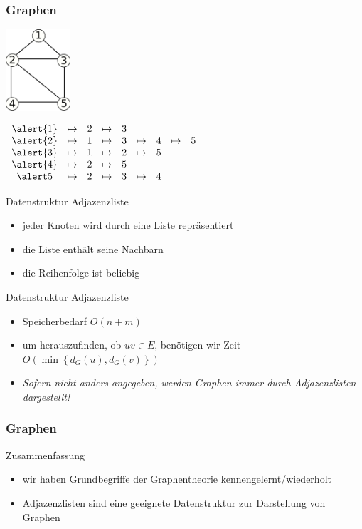 \documentclass[aspectratio=1610, 11pt]{beamer}
\newcommand\cbc[1]{\left\{{#1}\right\}}
\newcommand{\mytitle}{Graphen}
\begin{document}
\begin{frame}\frametitle{\mytitle}
	\includegraphics[height=30mm]{images/house.pdf}\hfill\parbox[t]{70mm}{\vspace{-26mm}$\begin{array}{cccccccccc}\alert{1}&\mapsto&2&\mapsto&3\\\alert{2}&\mapsto&1&\mapsto&3&\mapsto&4&\mapsto&5\\\alert{3}&\mapsto&1&\mapsto&2&\mapsto&5\\\alert{4}&\mapsto&2&\mapsto&5\\\alert5&\mapsto&2&\mapsto&3&\mapsto&4\end{array}$}
	\begin{overprint}
		\begin{exampleblock}{Datenstruktur Adjazenzliste}
			\begin{itemize}
				\item jeder Knoten wird durch eine Liste repr\"asentiert
				\item die Liste enth\"alt seine Nachbarn
				\item die Reihenfolge ist beliebig
			\end{itemize}
		\end{exampleblock}
		\begin{exampleblock}{Datenstruktur Adjazenzliste}
			\begin{itemize}
				\item Speicherbedarf $O(n+m)$
				\item um herauszufinden, ob $uv\in E$, ben\"otigen wir Zeit $O(\min\cbc{d_G(u),d_G(v)})$
				\item \emph{Sofern nicht anders angegeben, werden Graphen immer durch Adjazenzlisten dargestellt!}
			\end{itemize}
		\end{exampleblock}
	\end{overprint}
\end{frame}

\begin{frame}\frametitle{\mytitle}
	\begin{exampleblock}{Zusammenfassung}
		\begin{itemize}
			\item wir haben Grundbegriffe der Graphentheorie kennengelernt/wiederholt
			\item Adjazenzlisten sind eine geeignete Datenstruktur zur Darstellung von Graphen
		\end{itemize}
	\end{exampleblock}
\end{frame}
\end{document}

